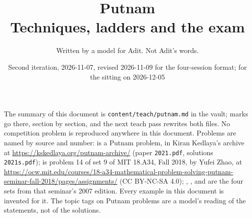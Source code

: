 
\title{Putnam\\[0.3em]\large Techniques, ladders and the exam}
\author{Written by a model for Adit. Not Adit's words.}
\date{Second iteration, 2026-11-07, revised 2026-11-09 for the four-session format; for the sitting on 2026-12-05}


\maketitle

\begin{sloppypar}
The summary of this document is \texttt{content/teach/putnam.md} in the vault; marks go there, section by section, and the next teach pass rewrites both files. No competition problem is reproduced anywhere in this document. Problems are named by source and number:  is a Putnam problem, in Kiran Kedlaya's archive at \url{https://kskedlaya.org/putnam-archive/} (paper \texttt{2021.pdf}, solutions \texttt{2021s.pdf});  is problem 14 of set 9 of MIT 18.A34, Fall 2018, by Yufei Zhao, at \url{https://ocw.mit.edu/courses/18-a34-mathematical-problem-solving-putnam-seminar-fall-2018/pages/assignments/} (CC BY-NC-SA 4.0); , ,  and  are the four sets from that seminar's 2007 edition. Every example in this document is invented for it. The topic tags on Putnam problems are a model's reading of the statements, not of the solutions.
\end{sloppypar}

\tableofcontents
\newpage





\newpage





















